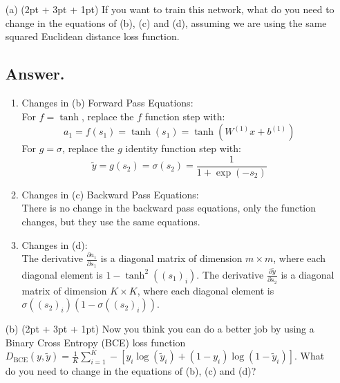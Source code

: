 \documentclass{article}
\begin{document}
\begin{itemize}
    \item[(a)] (2pt + 3pt + 1pt) If you want to train this network, what do you need to change in the equations of (b), (c) and (d), assuming we are using the same squared Euclidean distance loss function.
    \subsection*{Answer.}
    \begin{enumerate}
        \item{Changes in (b) Forward Pass Equations:}\\
        For $f = \tanh$, replace the $f$ function step with:
        \[ a_1 = f(s_1) = \tanh(s_1) = \tanh(W^{(1)}x + b^{(1)}) \]
        For \(g = \sigma\), replace the \(g\) identity function step with:
        \[ \tilde{y} = g(s_2) = \sigma(s_2) = \frac{1}{1 + \exp(-s_2)}  \]
        \item {Changes in (c) Backward Pass Equations:} \\
        There is no change in the backward pass equations, only the function changes, but they use the same equations.
        \item{Changes in (d):}\\
        The derivative \( \frac{\partial a_1}{\partial s_1} \) is a diagonal matrix of dimension \( m \times m \), where each diagonal element is \( 1-\tanh^2((s_1)_i) \).
        The derivative \( \frac{\partial \tilde{y}}{\partial s_2} \) is a diagonal matrix of dimension \( K \times K \), where each diagonal element is \( \sigma((s_2)_i)(1 - \sigma((s_2)_i)) \).

    \end{enumerate}



    
    \item[(b)] (2pt + 3pt + 1pt) Now you think you can do a better job by using a Binary Cross Entropy (BCE) loss function $D_{\text{BCE}}(y, \tilde{y}) = \frac{1}{K} \sum_{i=1}^{K} -[y_i \log(\tilde{y}_i) + (1 - y_i) \log(1 - \tilde{y}_i)]$. What do you need to change in the equations of (b), (c) and (d)?

\end{itemize}
\end{document}
